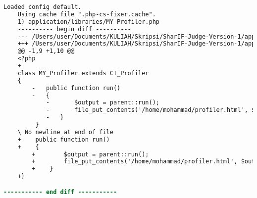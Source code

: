 \begin{lstlisting}[language=diff, caption=Perubahan pada kode MY\_Profiler.php]
	Loaded config default.
	Using cache file ".php-cs-fixer.cache".
	1) application/libraries/MY_Profiler.php
	---------- begin diff ----------
	--- /Users/user/Documents/KULIAH/Skripsi/SharIF-Judge-Version-1/application/libraries/MY_Profiler.php
	+++ /Users/user/Documents/KULIAH/Skripsi/SharIF-Judge-Version-1/application/libraries/MY_Profiler.php
	@@ -1,9 +1,10 @@
	<?php
	+
	class MY_Profiler extends CI_Profiler
	{
		-	public function run()
		-	{
			-		$output = parent::run();
			-		file_put_contents('/home/mohammad/profiler.html', $output);
			-	}
		-}
	\ No newline at end of file
	+    public function run()
	+    {
		+        $output = parent::run();
		+        file_put_contents('/home/mohammad/profiler.html', $output);
		+    }
	+}

----------- end diff -----------
\end{lstlisting}

